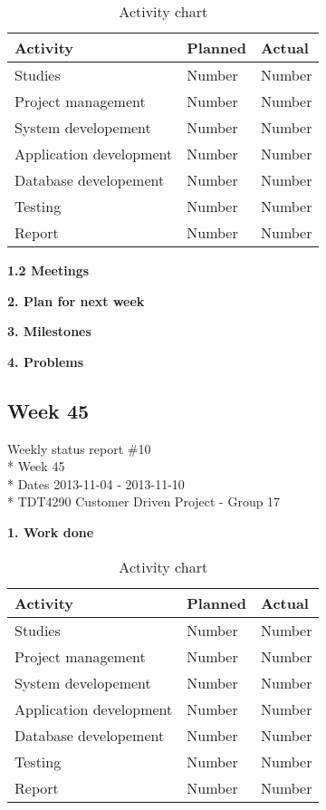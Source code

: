 \begin{table}[H]
\begin{center}
\begin{tabular}{ l | l | l }
  \hline
  Activity & Planned & Actual \\
  \hline\noalign{\smallskip}\noalign{\smallskip}\hline
  Studies & Number & Number \\
  Project management & Number & Number \\
  System developement & Number & Number \\
  Application development & Number & Number \\
  Database developement & Number & Number \\
  Testing & Number & Number \\
  Report & Number & Number \\
  \hline
\end{tabular}
\end{center}
\caption{Activity chart}
\label{table:activityChartStatusReport}
\end{table}

\textbf{1.2 Meetings}

\textbf{2. Plan for next week}

\textbf{3. Milestones}

\textbf{4. Problems}

\newpage
\subsection{Week 45}

\begin{center}
Weekly status report \#10\\*
Week 45 \\*
Dates 2013-11-04 - 2013-11-10 \\*
TDT4290 Customer Driven Project - Group 17
\end{center}

\textbf{1. Work done}

\begin{table}[H]
\begin{center}
\begin{tabular}{ l | l | l }
  \hline
  Activity & Planned & Actual \\
  \hline\noalign{\smallskip}\noalign{\smallskip}\hline
  Studies & Number & Number \\
  Project management & Number & Number \\
  System developement & Number & Number \\
  Application development & Number & Number \\
  Database developement & Number & Number \\
  Testing & Number & Number \\
  Report & Number & Number \\
  \hline
\end{tabular}
\end{center}
\caption{Activity chart}
\label{table:activityChartStatusReport}
\end{table}

